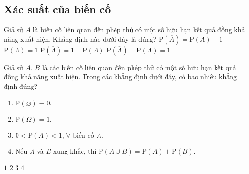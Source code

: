\subsection{Xác suất của biến cố}
\begin{ex}%
	Giả sử $A$ là biến cố liên quan đến phép thử có một số hữu hạn kết quả đồng khả năng xuất hiện. Khẳng định nào dưới đây là đúng?
	\choice
	{$\mathrm{P}(\overline{A})=\mathrm{P}(A)-1$}
	{$\mathrm{P}(A)=1$}
	{\True $\mathrm{P}(\overline{A})=1-\mathrm{P}(A)$}
	{$\mathrm{P}(\overline{A})-\mathrm{P}(A)=1$}
\end{ex}
\begin{ex}%
	Giả sử $A$, $B$ là  các biến cố liên quan đến phép thử có một số hữu hạn kết quả đồng khả năng xuất hiện. Trong các khẳng định dưới đây, có bao nhiêu khẳng định đúng?
	\begin{enumerate}
		\item $\mathrm{P}(\varnothing)=0.$
		\item $\mathrm{P}(\Omega)=1. $
		\item $0<\mathrm{P}(A)<1, \, \forall $ biến cố $A$.
		\item Nếu $A$ và $B$ xung khắc, thì $\mathrm{P}(A\cup B)= \mathrm{P}(A)+\mathrm{P}(B).$
	\end{enumerate}
	\choice
	{$1$}
	{$2$}
	{\True $3$}
	{$4$}
\end{ex}

